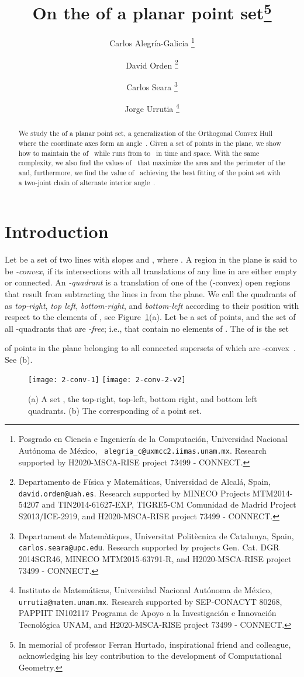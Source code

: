 \documentclass[11pt,letterpaper,english]{article}
\title{On the  of a planar point set\footnote{In memorial of professor Ferran Hurtado, inspirational friend and colleague, acknowledging his key contribution to the development of Computational Geometry.}}
\author{
  Carlos Alegr\'{i}a-Galicia
  \thanks{Posgrado en Ciencia e Ingenier\'{i}a de la Computaci\'on,
    Universidad Nacional Aut\'onoma de M\'exico, {\tt
      alegria\_c@uxmcc2.iimas.unam.mx}. Research supported by H2020-MSCA-RISE project 73499 - CONNECT.}
  \and
  David Orden
  \thanks{Departamento de F\'{i}sica y Matem\'aticas, Universidad de
    Alcal\'a, Spain, {\tt david.orden@uah.es}. Research supported by MINECO Projects
    MTM2014-54207 and TIN2014-61627-EXP, TIGRE5-CM Comunidad de Madrid Project S2013/ICE-2919, and H2020-MSCA-RISE project 73499 - CONNECT.}
  \and
  Carlos Seara
  \thanks{Departament de Matem\`atiques, Universitat
    Polit\`ecnica de Catalunya, Spain, {\tt
      carlos.seara@upc.edu}. Research supported by projects Gen. Cat. DGR 2014SGR46,
      MINECO MTM2015-63791-R, and H2020-MSCA-RISE project 73499 - CONNECT.}
  \and
  Jorge Urrutia
  \thanks{Instituto de Matem\'aticas, Universidad Nacional Aut\'onoma
    de M\'exico, {\tt urrutia@matem.unam.mx}. Research supported by SEP-CONACYT 80268, PAPPIIT IN102117 Programa de Apoyo a la Investigaci\'on e Innovaci\'on Tecnol\'ogica UNAM, and H2020-MSCA-RISE project 73499 - CONNECT.}}
\date{}
\theoremstyle{definition}
\begin{document}
\begin{abstract}
We study the  of a planar point set, a generalization of the
Orthogonal Convex Hull where the coordinate axes form an angle~.
Given a set  of  points in the plane, we show how to maintain
the  of~ while  runs from  to~ in
 time and  space.
With the same complexity, we also find the values of~
that maximize the area and the perimeter of the  and,
furthermore, we find the value of~ achieving the best fitting
of the point set  with a two-joint chain of alternate interior angle~.
\end{abstract}

\section{Introduction}\label{sec:intro}

Let  be a set of two lines with slopes  and ,
where . A region in the plane is said to be
\emph{-convex}, if its intersections with all translations of
any line in  are either empty or connected. An
\emph{-quadrant} is a translation of one of the
(-convex) open regions that result from subtracting the lines
in  from the plane. We call the quadrants of 
as \emph{top-right}, \emph{top left}, \emph{bottom-right}, and \emph{bottom-left}
according to their position with respect to the elements of ,
see Figure~\ref{intro:fig:bhull}(a).
Let  be a set of  points, and
 the set of all -quadrants that are
\emph{-free}; i.e., that contain no elements of . The
\emph{} of  is the set


of points in the plane belonging to all connected
supersets of  which are
-convex~\cite{alegria_2014,ottmann_1984}. See
(b).

\begin{figure}[ht]
  \centering
  \subcaptionbox{\label{intro:fig:bhull:1}}
  {\texttt{[image: 2-conv-1]}}
  \hspace{2cm}
  \subcaptionbox{\label{intro:fig:bhull:2}}
  {\texttt{[image: 2-conv-2-v2]}}
  \caption{(a) A set , the top-right, top-left, bottom right, and bottom left quadrants. (b) The corresponding  of a point set.}
  \label{intro:fig:bhull}
\end{figure}
\end{document}
